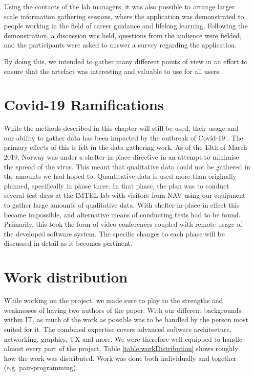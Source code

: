 Using the contacts of the lab managers, it was also possible to arrange larger scale information gathering sessions, where the application was demonstrated to people working in the field of career guidance and lifelong learning. Following the demonstration, a discussion was held, questions from the audience were fielded, and the participants were asked to answer a survey regarding the application. 

By doing this, we intended to gather many different points of view in an effort to ensure that the artefact was interesting and valuable to use for all users.

\section{Covid-19 Ramifications}
While the methods described in this chapter will still be used, their usage and our ability to gather data has been impacted by the outbreak of Covid-19 \cite{FhiCorona}. The primary effects of this is felt in the data gathering work. As of the 13th of March 2019, Norway was under a shelter-in-place directive in an attempt to minimise the spread of the virus. This meant that qualitative data could not be gathered in the amounts we had hoped to. Quantitative data is  used more than originally planned, specifically in phase three. In that phase, the plan was to conduct several test days at the IMTEL lab with visitors from NAV using our equipment to gather large amounts of qualitative data. With shelter-in-place in effect this became impossible, and alternative means of conducting tests had to be found. Primarily, this took the form of video conferences coupled with remote usage of the developed software system. The specific changes to  each phase will be discussed in detail as it becomes pertinent. 


\section{Work distribution}
While working on the project, we made sure to play to the strengths and weaknesses of having two authors of the paper. With our different backgrounds within IT, as much of the work as possible was to be handled by the person most suited for it. The combined expertise covers advanced software architecture, networking, graphics, UX and more. We were therefore well equipped to handle almost every part of the project. Table \ref{table:workDistribution} shows roughly how the work was distributed. Work was done both individually and together (e.g. pair-programming).  

